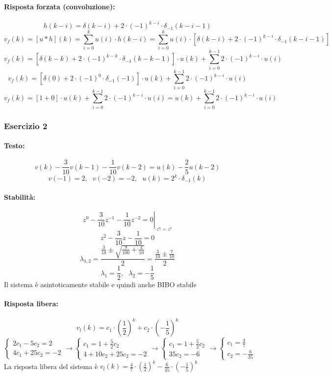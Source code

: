 \documentclass[a4paper]{article}
\begin{document}
	\paragraph{Risposta forzata (convoluzione):}
	\[ h(k-i) = \delta(k-i) + 2 \cdot (-1)^{k-i} \cdot \delta_{-1}(k-i-1) \]
	\[ v_f(k) = [u*h](k) = \sum_{i=0}^k u(i) \cdot h(k-i) = \sum_{i=0}^k u(i) \cdot [\delta(k-i) + 2 \cdot (-1)^{k-i} \cdot \delta_{-1}(k-i-1)] \]
	\[ v_f(k) = [\delta(k-k) + 2 \cdot (-1)^{k-k} \cdot \delta_{-1}(k-k-1)] \cdot u(k) + \sum_{i=0}^{k-1} 2 \cdot (-1)^{k-i} \cdot u(i) \]
	\[ v_f(k) = [\delta(0) + 2 \cdot (-1)^{0} \cdot \delta_{-1}(-1)] \cdot u(k) + \sum_{i=0}^{k-1} 2 \cdot (-1)^{k-i} \cdot u(i) \]
	\[ v_f(k) = [1 + 0] \cdot u(k) + \sum_{i=0}^{k-1} 2 \cdot (-1)^{k-i} \cdot u(i) = u(k) + \sum_{i=0}^{k-1} 2 \cdot (-1)^{k-i} \cdot u(i) \]

	
	\subsubsection{Esercizio 2}
	\paragraph{Testo:}
	\[ v(k) - \frac{3}{10} v(k-1) - \frac{1}{10} v(k-2) = u(k) - \frac{2}{5} u(k-2) \]
	\[ v(-1) = 2, \text{ } v(-2) = -2, \text{ } u(k) = 2^k \cdot \delta_{-1}(k) \]

	\paragraph{Stabilità:}
	\[ \left. z^0 - \frac{3}{10} z^{-1} - \frac{1}{10} z^{-2} = 0 \right|_{\cdot z^n = z^2} \]
	\[ z^2 - \frac{3}{10} z - \frac{1}{10} = 0 \]
	\[ \lambda_{1,2} = \frac{\frac{3}{10} \pm \sqrt{\frac{9}{100} + \frac{4}{10}}}{2} = \frac{\frac{3}{10} \pm \frac{7}{10}}{2}\]
	\[ \lambda_1 = \frac{1}{2}, \text{ } \lambda_2 = - \frac{1}{5} \]
	Il sistema è asintoticamente stabile e quindi anche BIBO stabile
	
	\paragraph{Risposta libera:}
	\[ v_l(k) = c_1 \cdot \left( \frac{1}{2} \right)^k + c_2 \cdot \left( - \frac{1}{5} \right)^k \]
	\[
	\begin{cases}
		2c_1 - 5c_2 = 2 \\
		4c_1 + 25c_2 = -2
	\end{cases}
	\longrightarrow
	\begin{cases}
		c_1 = 1 + \frac{5}{2} c_2 \\
		4 + 10c_2 + 25c_2 = -2
	\end{cases}
	\longrightarrow
	\begin{cases}
		c_1 = 1 + \frac{5}{2} c_2 \\
		35c_2 = -6
	\end{cases}
	\longrightarrow
	\begin{cases}
		c_1 = \frac{4}{7} \\
		c_2 = - \frac{6}{35}
	\end{cases}
	\]
	La risposta libera del sistema è $v_l(k) = \frac{4}{7} \cdot \left( \frac{1}{2} \right)^k - \frac{6}{35} \cdot \left( - \frac{1}{5} \right)^k$
	
\end{document}
